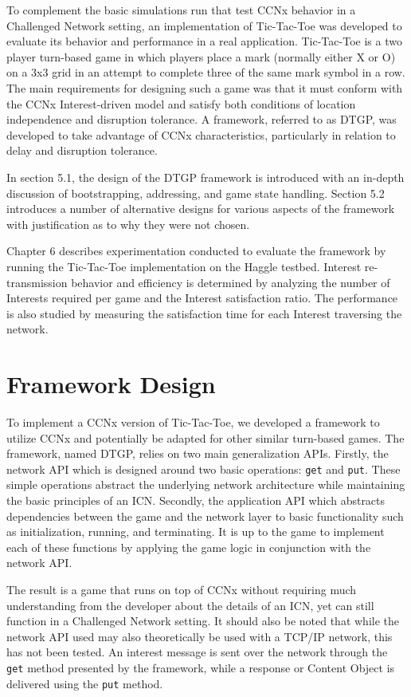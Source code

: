 \documentclass[a4paper,12pt]{report}      %
\begin{document}
To complement the basic simulations run that test CCNx behavior in a Challenged Network setting, an
implementation of Tic-Tac-Toe was developed to evaluate its behavior and performance in a real
application. Tic-Tac-Toe is a two player turn-based game in which players place a mark (normally either X or O)
 on a 3x3 grid in an attempt to complete three of the same mark symbol in a row. 
The main requirements for designing such a game was that it must conform with the
CCNx Interest-driven model and satisfy both conditions of location independence and disruption
tolerance. A framework, referred to as DTGP, was developed to take advantage of CCNx characteristics, 
particularly in relation to delay and disruption tolerance.

In section 5.1, the design of the DTGP framework is introduced with an in-depth discussion of bootstrapping,
addressing, and game state handling. Section 5.2 introduces a number of alternative designs for various aspects 
of the framework with justification as to why they were not chosen. 

Chapter 6 describes experimentation conducted to evaluate the framework by running the Tic-Tac-Toe implementation on the Haggle testbed. Interest re-transmission behavior and efficiency is determined by analyzing the number of Interests required per game and the Interest satisfaction ratio. The performance is also studied by measuring the satisfaction time for each Interest traversing the network.    

\section{Framework Design}

To implement a CCNx version of Tic-Tac-Toe, we developed a framework to utilize CCNx and potentially be adapted 
for other similar turn-based games. The framework, named DTGP, relies on two main generalization APIs.
Firstly, the network API which is designed around two basic operations: \verb!get! and \verb!put!. These simple
operations abstract the underlying network architecture while maintaining the basic principles of an
ICN. Secondly, the application API which abstracts dependencies between the game and the
network layer to basic functionality such as initialization, running, and terminating. It is up to the game
to implement each of these functions by applying the game logic in conjunction with the network API.

The result is a game that runs on top of CCNx without requiring much understanding from the
developer about the details of an ICN, yet can still function in a Challenged Network setting. It should
also be noted that while the network API used may also theoretically be used with a TCP/IP network,
this has not been tested. An interest message is sent over the network through the \verb!get! method presented
 by the framework, while  a response or Content Object is delivered using the \verb!put! method. 
\end{document}
